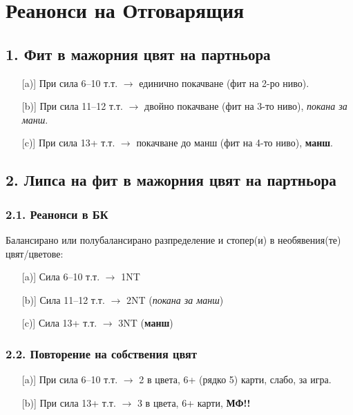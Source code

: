 \documentclass[10pt,a5paper]{extarticle}
\begin{document}
\section{Реанонси на Отговарящия}

\subsection*{1. Фит в мажорния цвят на партньора}
\begin{itemize}
  \item[][a)] При сила 6–10 т.т. $\rightarrow$ единично покачване (фит на 2-ро ниво).
  \item[][b)] При сила 11–12 т.т. $\rightarrow$ двойно покачване (фит на 3-то ниво), \emph{покана за манш}.
  \item[][c)] При сила 13+ т.т. $\rightarrow$ покачване до манш (фит на 4-то ниво), \textbf{манш}.
\end{itemize}

\subsection*{2. Липса на фит в мажорния цвят на партньора}

\subsubsection*{2.1. Реанонси в БК}
Балансирано или полубалансирано разпределение и стопер(и) в необявения(те) цвят/цветове:  
\begin{itemize}
  \item[][a)] Сила 6–10 т.т. $\rightarrow$ 1NT
  \item[][b)] Сила 11–12 т.т. $\rightarrow$ 2NT (\emph{покана за манш})
  \item[][c)] Сила 13+ т.т. $\rightarrow$ 3NT (\textbf{манш})
\end{itemize}

\subsubsection*{2.2. Повторение на собствения цвят}
\begin{itemize}
  \item[][a)] При сила 6–10 т.т. $\rightarrow$ 2 в цвета, 6+ (рядко 5) карти, слабо, за игра.
  \item[][b)] При сила 13+ т.т. $\rightarrow$ 3 в цвета, 6+ карти, \textbf{МФ!!}
\end{itemize}
\end{document}

